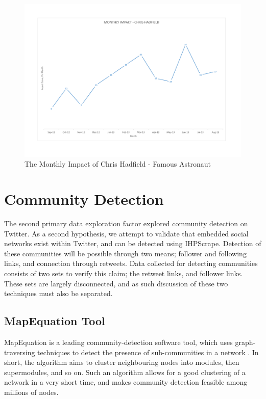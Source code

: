 \begin{figure}[h!]
\begin{center}
\centering
\includegraphics[width=500px]{Images/chris_hadfield_monthly_impact.pdf}
\caption{The Monthly Impact of Chris Hadfield - Famous Astronaut}
\label{fig:hadfield}
\end{center}
\end{figure}

\section{Community Detection}

The second primary data exploration factor explored community detection on Twitter. As a second hypothesis, we attempt to validate that embedded social networks exist within Twitter, and can be detected using IHPScrape. Detection of these communities will be possible through two means; follower and following links, and connection through retweets. Data collected for detecting communities consists of two sets to verify this claim; the retweet links, and follower links. These sets are largely disconnected, and as such discussion of these two techniques must also be separated.  

\subsection{MapEquation Tool}

MapEquation is a leading community-detection software tool, which uses graph-traversing techniques to detect the presence of sub-communities in a network \cite{mapequation}. In short, the algorithm aims to cluster neighbouring nodes into modules, then supermodules, and so on. Such an algorithm allows for a good clustering of a network in a very short time, and makes community detection feasible among millions of nodes.

